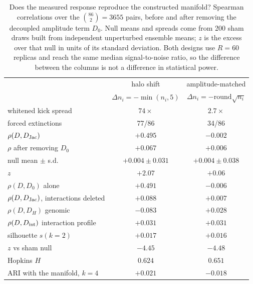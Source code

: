 \begin{table}[t]
\caption{\label{tab:reliability}Does the measured response reproduce the
constructed manifold?  Spearman correlations over the $\binom{86}{2}=3655$
pairs, before and after removing the decoupled amplitude term $D_0$.  Null
means and spreads come from 200 sham draws built from independent unperturbed
ensemble means; $z$ is the excess over that null in units of its standard
deviation.  Both designs use $R=60$ replicas and reach the same median
signal-to-noise ratio, so the difference between the columns is not a
difference in statistical power.}
\begin{ruledtabular}
\begin{tabular}{lcc}
 & halo shift & amplitude-matched \\
 & $\Delta n_i=-\min(n_i,5)$ & $\Delta n_i=-\mathrm{round}\sqrt{n_i}$ \\ \hline
whitened kick spread & $74\times$ & $2.7\times$ \\
forced extinctions & 77/86 & 34/86 \\ \hline
$\rho(D,D_{\rm Jac})$ & $+0.495$ & $-0.002$ \\
$\rho$ after removing $D_0$ & $+0.067$ & $+0.006$ \\
\quad null mean $\pm$ s.d. & $+0.004\pm0.031$ & $+0.004\pm0.038$ \\
\quad $z$ & $+2.07$ & $+0.06$ \\ \hline
$\rho(D,D_0)$ alone & $+0.491$ & $-0.006$ \\
$\rho(D,D_{\rm Jac})$, interactions deleted & $+0.088$ & $+0.007$ \\ \hline
$\rho(D,D_H)$ genomic & $-0.083$ & $+0.028$ \\
$\rho(D,D_{\rm int})$ interaction profile & $+0.031$ & $+0.031$ \\ \hline
silhouette $s(k{=}2)$ & $+0.017$ & $+0.016$ \\
\quad $z$ vs sham null & $-4.45$ & $-4.48$ \\
Hopkins $H$ & $0.624$ & $0.651$ \\
ARI with the manifold, $k=4$ & $+0.021$ & $-0.018$ \\
\end{tabular}
\end{ruledtabular}
\end{table}